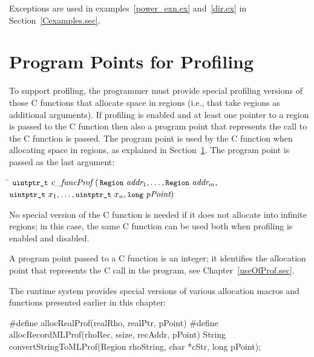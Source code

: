 \documentclass[12pt]{book}
\begin{document}
Exceptions are used in examples~\ref{power_exn.ex} and~\ref{dir.ex} in
Section~\ref{Cexamples.sec}.

\section{Program Points for Profiling}
\label{prof.sec}
To support profiling, the programmer must provide special profiling versions of
those C functions that allocate space in regions (i.e., that take regions as
additional arguments). If profiling is enabled and at least one pointer to a
region is passed to the C function then also a program point that represents the
call to the C function is passed.  The program point is used by the C function
when allocating space in regions, as explained in Section~\ref{prof.sec}. The
program point is passed as the last argument:
\begin{tabbing}
\indent\=  $\kw{uintptr\_t} \ \emph{c\_funcProf} \ ($\=$\mbox{\small\ttfamily Region}\ \emph{addr}_1,
    \ldots, \mbox{\small\ttfamily Region}\ \emph{addr}_m,$\\
  \>\>$ \mbox{\small\ttfamily uintptr\_t}\ x_1, \ldots,
    \mbox{\small\ttfamily uintptr\_t}\ x_n, \mbox{\small\ttfamily long}\ \emph{pPoint}) $
\end{tabbing}
\noindent
No special version of the C function is needed if it does not allocate into
infinite regions; in this case, the same C function can be used both when
profiling is enabled and disabled.

A program point passed to a C function is an integer; it identifies the
allocation point that represents the C call in the program, see
Chapter~\ref{useOfProf.sec}.

The runtime system provides special versions of various allocation macros and
functions presented earlier in this chapter:
%
%
%
%
%
\begin{scriptcode}
  #define allocRealProf(realRho, realPtr, pPoint)
  #define allocRecordMLProf(rhoRec, ssize, recAddr, pPoint)
  String convertStringToMLProf(Region rhoString,
                               char *cStr,
                               long pPoint);
\end{scriptcode}
\end{document}
